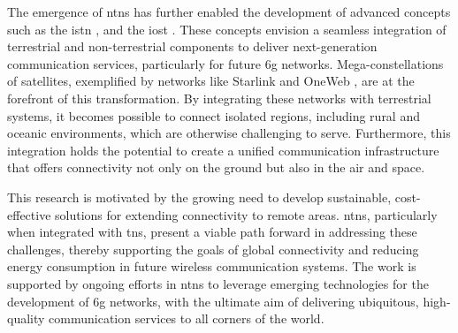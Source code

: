 The emergence of \glspl{ntn} has further enabled the development of advanced concepts such as the \gls{istn} \autocite{ao2018space}\autocite{huang2019airplane}\autocite{liu2022operation}, and the \gls{iost} \autocite{akyildiz2019internet}\autocite{priyadarshini2022novel}\autocite{kak2021designing}. These concepts envision a seamless integration of terrestrial and non-terrestrial components to deliver next-generation communication services, particularly for future \gls{6g} networks. Mega-constellations of satellites, exemplified by networks like Starlink \autocite{tao2022impact} and OneWeb \autocite{zhu2022laser}, are at the forefront of this transformation. By integrating these networks with terrestrial systems, it becomes possible to connect isolated regions, including rural and oceanic environments, which are otherwise challenging to serve. Furthermore, this integration holds the potential to create a unified communication infrastructure that offers connectivity not only on the ground but also in the air and space.

This research is motivated by the growing need to develop sustainable, cost-effective solutions for extending connectivity to remote areas. \glspl{ntn}, particularly when integrated with \glspl{tn}, present a viable path forward in addressing these challenges, thereby supporting the goals of global connectivity and reducing energy consumption in future wireless communication systems. The work is supported by ongoing efforts in \glspl{ntn} to leverage emerging technologies for the development of \gls{6g} networks, with the ultimate aim of delivering ubiquitous, high-quality communication services to all corners of the world.

